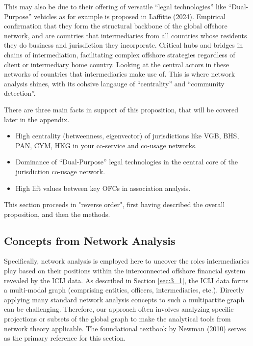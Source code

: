 This may also be due to their offering of versatile ``legal technologies'' like ``Dual-Purpose'' vehicles as for example is proposed in Laffitte (2024). Empirical confirmation that they form the structural backbone of the global offshore network, and are countries that intermediaries from all countries whose residents they do business and jurisdiction they incorporate. Critical hubs and bridges in chains of intermediation, facilitating complex offshore strategies regardless of client or intermediary home country. Looking at the central actors in these networks of countries that intermediaries make use of. This is where network analysis shines, with its cohsive langauge of ``centrality'' and ``community detection''.

There are three main facts in support of this proposition, that will be covered later in the appendix.
\begin{itemize}
    \item High centrality (betweenness, eigenvector) of jurisdictions like VGB, BHS, PAN, CYM, HKG in your co-service and co-usage networks.
    \item Dominance of ``Dual-Purpose'' legal technologies in the central core of the jurisdiction co-usage network.
    \item High lift values between key OFCs in association analysis.
\end{itemize}

This section proceeds in "reverse order", first having described the overall proposition, and then the methods.

\subsection{Concepts from Network Analysis}
\label{subsec:network_theory_concepts}

Specifically, network analysis is employed here to uncover the roles intermediaries play based on their positions within the interconnected offshore financial system revealed by the ICIJ data. As described in Section \ref{sec:3_1}, the ICIJ data forms a multi-modal graph (comprising entities, officers, intermediaries, etc.). Directly applying many standard network analysis concepts to such a multipartite graph can be challenging. Therefore, our approach often involves analyzing specific projections or subsets of the global graph to make the analytical tools from network theory applicable. The foundational textbook by Newman (2010) serves as the primary reference for this section.

